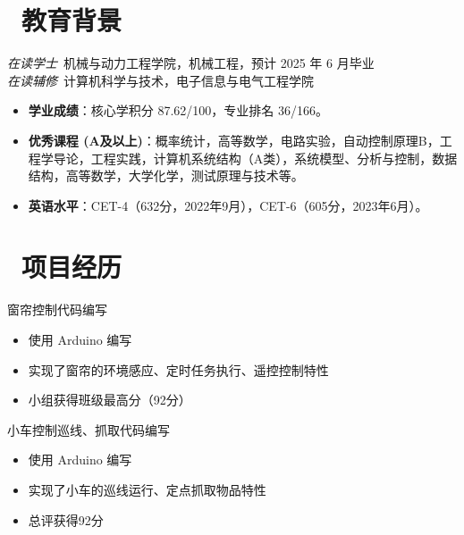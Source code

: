 \documentclass{resume}
\begin{document}


 
\section{\faGraduationCap\  教育背景}
\textit{在读学士}\ 机械与动力工程学院，机械工程，预计 2025 年 6 月毕业\\
\textit{在读辅修}\ 计算机科学与技术，电子信息与电气工程学院
\begin{itemize}
  \item \textbf{学业成绩}：核心学积分 87.62/100，专业排名 36/166。
  \item \textbf{优秀课程 (A及以上)}：概率统计，高等数学\uppercase\expandafter{}，电路实验，自动控制原理B，工程学导论，工程实践，计算机系统结构（A类），系统模型、分析与控制，数据结构，高等数学\uppercase\expandafter{}，大学化学，测试原理与技术等。
  \item \textbf{英语水平}：CET-4（632分，2022年9月），CET-6（605分，2023年6月）。
\end{itemize}


\section{\faUsers\ 项目经历}
窗帘控制代码编写
\begin{itemize}
  \item 使用 Arduino 编写
  \item 实现了窗帘的环境感应、定时任务执行、遥控控制特性
  \item 小组获得班级最高分（92分）
\end{itemize}

小车控制巡线、抓取代码编写
\begin{itemize}
  \item 使用 Arduino 编写
  \item 实现了小车的巡线运行、定点抓取物品特性
  \item 总评获得92分
\end{itemize}

\end{document}
